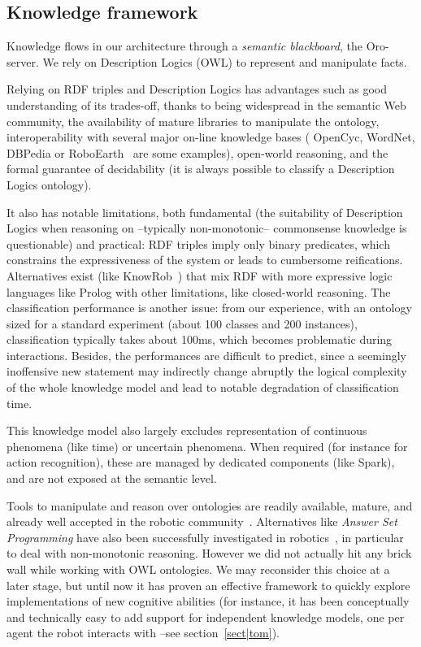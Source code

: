\documentclass[preprint,3p,times]{elsarticle}
\begin{document}
\subsection{Knowledge framework}
\label{krs-discussion}

Knowledge flows in our architecture through a \emph{semantic blackboard}, the
{\sc Oro}-server. We rely on Description Logics (OWL) to represent and
manipulate facts.

Relying on RDF triples and Description Logics has advantages such as good
understanding of its trades-off, thanks to being widespread in the semantic Web
community, the availability of mature libraries to manipulate the ontology,
interoperability with several major on-line knowledge bases ({\sc
OpenCyc}, {\sc WordNet}, {\sc DBPedia} or {\sc RoboEarth}~\cite{Waibel2011} are
some examples), open-world reasoning, and the formal guarantee of decidability
(it is always possible to classify a Description Logics ontology).

It also has notable limitations, both fundamental (the suitability of
Description Logics when reasoning on --typically non-monotonic-- commonsense
knowledge is questionable) and practical: RDF triples imply only binary
predicates, which constrains the expressiveness of the system or leads to
cumbersome reifications. Alternatives exist (like {\sc
KnowRob}~\cite{Tenorth2009a}) that mix RDF with more expressive logic languages
like {\sc Prolog} with other limitations, like closed-world reasoning. The
classification performance is another issue: from our experience, with an
ontology sized for a standard experiment (about 100 classes and 200 instances),
classification typically takes about 100ms, which becomes problematic during
interactions.  Besides, the performances are difficult to predict, since a
seemingly inoffensive new statement may indirectly change abruptly the logical
complexity of the whole knowledge model and lead to notable degradation of
classification time.

This knowledge model also largely excludes representation of continuous
phenomena (like time) or uncertain phenomena. When required (for instance for
action recognition), these are managed by dedicated components (like {\sc
Spark}), and are not exposed at the semantic level.

Tools to manipulate and reason over ontologies are readily available, mature,
and already well accepted in the robotic community~\cite{Tenorth2009a,
Lim2011}. Alternatives like \emph{Answer Set Programming} have also been
successfully investigated in robotics~\cite{Chen2010,Erdem2012}, in particular
to deal with non-monotonic reasoning. However we did not actually hit any brick wall
while working with OWL ontologies. We may reconsider this choice at a later
stage, but until now it has proven an effective framework to quickly explore
implementations of new cognitive abilities (for instance, it has been
conceptually and technically easy to add support for independent knowledge
models, one per agent the robot interacts with --see section~\ref{sect|tom}).
\end{document}
